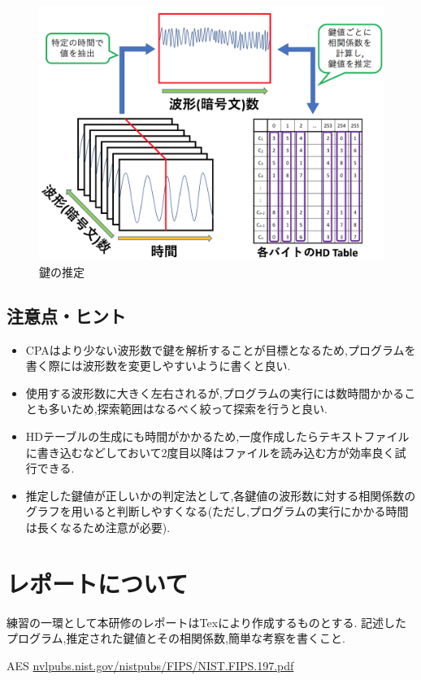 \documentclass[11pt]{jarticle}
\begin{document}
\newpage
\begin{figure}[htbp]
	\begin{center}
		\includegraphics[width=0.8\hsize, bb=0 0 750 550]{../images/CPA_image3.png}
		\caption{鍵の推定}
	\end{center}
\end{figure}

\subsection{注意点・ヒント}
\begin{itemize}
\item CPAはより少ない波形数で鍵を解析することが目標となるため,プログラムを書く際には波形数を変更しやすいように書くと良い.
\item 使用する波形数に大きく左右されるが,プログラムの実行には数時間かかることも多いため,探索範囲はなるべく絞って探索を行うと良い.
\item HDテーブルの生成にも時間がかかるため,一度作成したらテキストファイルに書き込むなどしておいて2度目以降はファイルを読み込む方が効率良く試行できる.
\item 推定した鍵値が正しいかの判定法として,各鍵値の波形数に対する相関係数のグラフを用いると判断しやすくなる(ただし,プログラムの実行にかかる時間は長くなるため注意が必要).
\end{itemize}

\section{レポートについて}
練習の一環として本研修のレポートはTexにより作成するものとする.
記述したプログラム,推定された鍵値とその相関係数,簡単な考察を書くこと.

\begin{thebibliography}{99}
 AES \url{nvlpubs.nist.gov/nistpubs/FIPS/NIST.FIPS.197.pdf}
\end{thebibliography}
\end{document}
